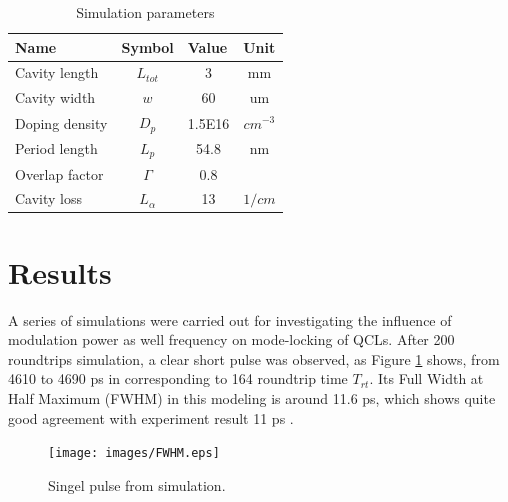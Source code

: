 \documentclass[11pt,final]{scrbook}
\begin{document}
\begin{table}[]
\centering
\caption{Simulation parameters}
\label{SIMparameter}
\begin{tabular}{llll}
\hline
\multicolumn{1}{|l|}{\textbf{Name}}  & \multicolumn{1}{l|}{\textbf{Symbol}} & \multicolumn{1}{l|}{\textbf{Value}} & \multicolumn{1}{l|}{\textbf{Unit}}         \\ \hline
\multicolumn{1}{|l|}{Cavity length}  & \multicolumn{1}{c|}{$L_{tot}$}       & \multicolumn{1}{c|}{3}              & \multicolumn{1}{c|}{mm}                    \\ %
\multicolumn{1}{|l|}{Cavity width}  & \multicolumn{1}{c|}{$w$}   & \multicolumn{1}{c|}{60}              & \multicolumn{1}{c|}{um}                    \\ %
\multicolumn{1}{|l|}{Doping density} & \multicolumn{1}{c|}{$D_{p}$ }        & \multicolumn{1}{c|}{1.5E16}         & \multicolumn{1}{c|}{$cm^{-3}$} 			   \\ %
\multicolumn{1}{|l|}{Period length}  & \multicolumn{1}{c|}{$L_{p}$}         & \multicolumn{1}{c|}{54.8}           & \multicolumn{1}{c|}{nm}                    \\ %
\multicolumn{1}{|l|}{Overlap factor} & \multicolumn{1}{c|}{$\Gamma$}          & \multicolumn{1}{c|}{0.8}          & \multicolumn{1}{c|}{}                      \\ 
 \multicolumn{1}{|l|}{Cavity loss}     &  \multicolumn{1}{c|}{$L_{\alpha}$}    &\multicolumn{1}{c|}{13}				&  \multicolumn{1}{c|}{$1/cm$} 						\\ \hline
\end{tabular}
\end{table}


\section{Results}
A series of simulations were carried out for investigating the influence of modulation power as well frequency on mode-locking of QCLs. After 200 roundtrips simulation, a clear short pulse was observed, as Figure \ref{fig:FWHM} shows, from 4610 to 4690 ps in corresponding to 164 roundtrip time $T_{rt}$. Its Full Width at Half Maximum (FWHM) in this modeling is around 11.6 ps, which shows quite good agreement with experiment result 11 ps \cite{gellie2010injection}.
\begin{figure}[htbp]
\begin{center}
\texttt{[image: images/FWHM.eps]}
\caption{Singel pulse from simulation.}
\label{fig:FWHM}
\end{center}
\end{figure}
\end{document}
